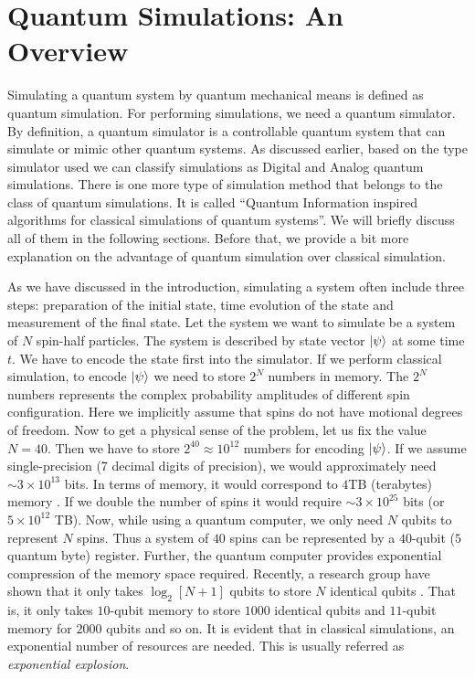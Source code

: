\documentclass[12pt,a4paper]{report}
\begin{document}
\newpage
\thispagestyle{empty}
\mbox{}
\newpage
\chapter{Quantum Simulations: An Overview}\label{sec1}

Simulating a quantum system by quantum mechanical means is defined as quantum simulation. For performing simulations, we need a quantum simulator.  By definition, a quantum simulator is a controllable quantum system that can simulate or mimic other quantum systems. As discussed earlier, based on the type simulator used we can classify simulations as Digital and Analog quantum simulations. There is one more type of simulation method that belongs to the class of quantum simulations. It is called “Quantum Information inspired algorithms for classical simulations of quantum systems”. We will briefly discuss all of them in the following sections. Before that, we provide a bit more explanation on the advantage of quantum simulation over classical simulation.

As we have discussed in the introduction, simulating a system often include three steps: preparation of the initial state, time evolution of the state and measurement of the final state. Let the system we want to simulate be a system of $N$ spin-half particles. The system is described by state vector $\ket{\psi}$ at some time $t$. We have to encode the state first into the simulator.  If we perform classical simulation, to encode $\ket{\psi}$ we need to store $2^{N}$ numbers in memory. The $2^{N}$ numbers represents the complex probability amplitudes of different spin configuration. Here we implicitly assume that spins do not have motional degrees of freedom. Now to get a physical sense of the problem, let us fix the value $N=40$. Then we have to store $2^{40} \approx 10^{12}$ numbers for encoding $\ket{\psi}$. If we assume single-precision (7 decimal digits of precision), we would approximately need $\sim 3 \times 10^{13}$ bits. In terms of memory, it would correspond to $4$TB (terabytes) memory \cite{lloyd}\cite{georgescu}. If we double the number of spins it would require $\sim 3 \times 10^{25}$ bits (or $5 \times 10^{12}$ TB). Now, while using a quantum computer, we only need $N$ qubits to represent $N$ spins. Thus a system of $40$ spins can be represented by a $40$-qubit ($5$ quantum byte) register. Further, the quantum computer provides exponential compression of the memory space required. Recently, a research group have shown that it only takes $\log_{2} [N+1]$ qubits to store $N$ identical qubits \cite{rozema}. That is, it only takes $10$-qubit memory to store $1000$ identical qubits and $11$-qubit memory for $2000$ qubits and so on. It is evident that in classical simulations, an exponential number of resources are needed. This is usually referred as \emph{exponential explosion}.
\end{document}
